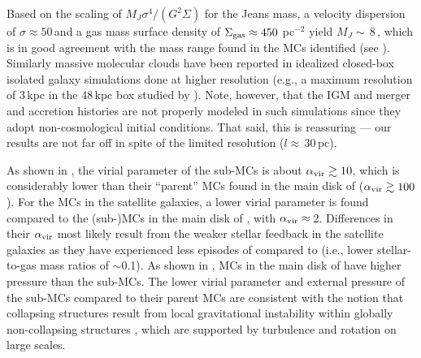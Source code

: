 \IfFileExists{emulateapjlegacy.cls}{\documentclass[iop]{emulateapjlegacy}}{\documentclass[iop]{emulateapj}}
\newcommand{\DL}[1]{({\bf \color{dlcolor} DL: #1})}
\begin{document}
Based on the scaling of $M_J$\eq$\sigma^4/(G^2\Sigma)$ for the Jeans mass, a velocity dispersion of $\sigma\approx50$\,\kms and a gas mass surface density of $\Sigma_{\rm gas}\approx450$\,\Msun\,pc$^{-2}$ yield $M_J\sim$\,8\,\Msun, which is in good agreement with the mass range found in the MCs identified (see ).
%
Similarly massive molecular clouds have been reported in idealized closed-box isolated galaxy simulations done at higher resolution (e.g., a maximum 
resolution of 3\,kpc in the 48\,kpc box studied by \citealt{Behrendt16a}). 
Note, however, that the IGM and merger and accretion histories are not properly modeled in such simulations since they adopt non-cosmological initial conditions. That said, this is reassuring --- our results are not far off in spite of the limited resolution ($l\approx$\,30\,pc).


As shown in , the virial parameter of the sub-MCs is about $\alpha_{\rm vir}\gtrsim10$, which is considerably lower than their ``parent'' MCs found in the main disk of \flower ($\alpha_{\rm vir}\gtrsim100$).
%
For the MCs in the satellite galaxies, a lower virial parameter is found compared to the (sub-)MCs in the main disk of \flower, with $\alpha_{\rm vir}\approx$\,2.
Differences in their $\alpha_{\rm vir}$ most likely result from the weaker stellar feedback in the satellite galaxies as they have experienced less episodes of \SF compared to \flower (i.e., lower stellar-to-gas mass ratios of $\sim$0.1).
As shown in , MCs in the main disk of \flower have higher pressure than the sub-MCs. The lower virial parameter and external pressure of the sub-MCs compared to their parent MCs are consistent with the notion that collapsing structures result from local gravitational instability within globally non-collapsing structures \citep[see e.g.,][]{Ballesteros-Paredes11a}, which are supported by turbulence and rotation on large scales.
\end{document}
